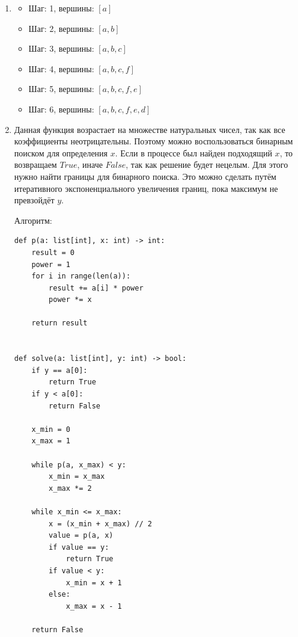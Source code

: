 \documentclass{article}
\begin{document}
\begin{enumerate}
\begin{lstlisting}
def find_path(graph: dict):
    visited = {node: False for node in graph}
    for node in graph:
        path = dfs(graph, node, visited, [])
        if path:
            return path
    return None
        \end{lstlisting}
	      Доказать, что путь всегда существует, не получилось :(

	\item
	      \begin{itemize}
		      \item Шаг: 1, вершины: $[a]$
		      \item Шаг: 2, вершины: $[a, b]$
		      \item Шаг: 3, вершины: $[a, b, c]$
		      \item Шаг: 4, вершины: $[a, b, c, f]$
		      \item Шаг: 5, вершины: $[a, b, c, f, e]$
		      \item Шаг: 6, вершины: $[a, b, c, f, e, d]$
	      \end{itemize}

	\item Данная функция возрастает на множестве
	      натуральных чисел, так как все коэффициенты
	      неотрицательны. Поэтому можно воспользоваться
	      бинарным поиском для определения $x$. Если
	      в процессе был найден подходящий $x$, то
	      возвращаем $True$, иначе $False$, так как решение
	      будет нецелым. Для этого нужно найти границы для
	      бинарного поиска. Это можно сделать путём итеративного
	      экспоненциального увеличения границ, пока
	      максимум не превзойдёт $y$.

	      Алгоритм:
	      \begin{lstlisting}
def p(a: list[int], x: int) -> int:
    result = 0
    power = 1
    for i in range(len(a)):
        result += a[i] * power
        power *= x

    return result


def solve(a: list[int], y: int) -> bool:
    if y == a[0]:
        return True
    if y < a[0]:
        return False

    x_min = 0
    x_max = 1

    while p(a, x_max) < y:
        x_min = x_max
        x_max *= 2

    while x_min <= x_max:
        x = (x_min + x_max) // 2
        value = p(a, x)
        if value == y:
            return True
        if value < y:
            x_min = x + 1
        else:
            x_max = x - 1

    return False 
          \end{lstlisting}


\end{enumerate}
\end{document}
